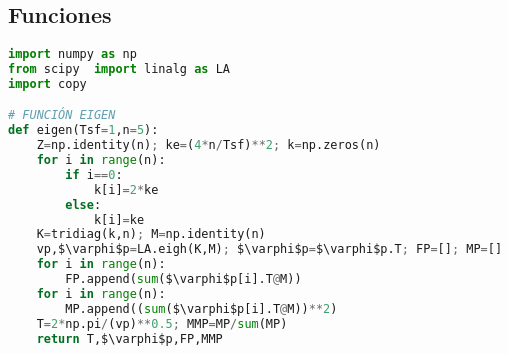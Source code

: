 \subsection*{Funciones}
{}

\begin{MyFont}
\begin{adjustwidth}{4.8mm}{}
\begin{lstlisting}[language=Python, caption={\footnotesize Funciones-KS}, mathescape=true,label={Algoritmo2}]
import numpy as np
from scipy  import linalg as LA
import copy

# FUNCIÓN EIGEN
def eigen(Tsf=1,n=5):
    Z=np.identity(n); ke=(4*n/Tsf)**2; k=np.zeros(n)
    for i in range(n):
        if i==0:
            k[i]=2*ke
        else:
            k[i]=ke
    K=tridiag(k,n); M=np.identity(n)
    vp,$\varphi$p=LA.eigh(K,M); $\varphi$p=$\varphi$p.T; FP=[]; MP=[] 
    for i in range(n):
        FP.append(sum($\varphi$p[i].T@M))
    for i in range(n):
        MP.append((sum($\varphi$p[i].T@M))**2)
    T=2*np.pi/(vp)**0.5; MMP=MP/sum(MP)
    return T,$\varphi$p,FP,MMP

\end{lstlisting}
\end{adjustwidth}
\end{MyFont}
